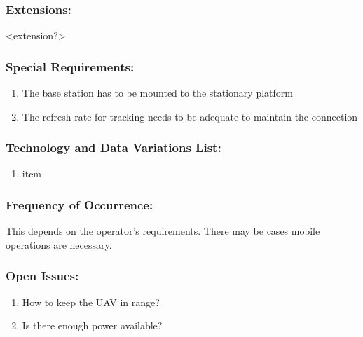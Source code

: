 \documentclass[ProductRequirements.tex]{subfiles}
\begin{document}
	\subsubsection*{Extensions:}
	<extension?>
	\subsubsection*{Special Requirements:}
	\begin{enumerate}\itemsep1pt
		\item The base station has to be mounted to the stationary platform
		\item The refresh rate for tracking needs to be adequate to maintain the connection
	\end{enumerate}
	\subsubsection*{Technology and Data Variations List:}
	\begin{enumerate}\itemsep1pt
		\item item
	\end{enumerate}
	\subsubsection*{Frequency of Occurrence:}
	This depends on the operator's requirements. There may be cases mobile operations are necessary.
	\subsubsection*{Open Issues:}
	\begin{enumerate}\itemsep1pt
		\item How to keep the UAV in range?
		\item Is there enough power available?
	\end{enumerate}		

		
\end{document}
